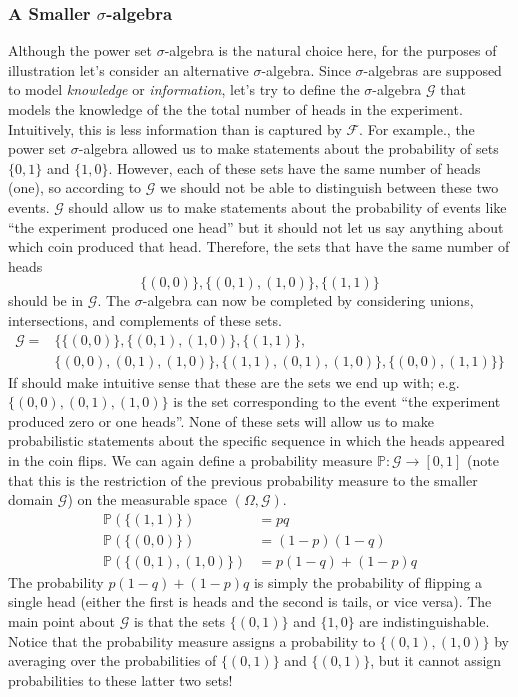 \documentclass[12pt]{article}
\newcommand{\Prob}{\mathbb{P}}
\begin{document}
\subsubsection{A Smaller $\sigma$-algebra}
Although the power set $\sigma$-algebra is the natural choice here, for the purposes of illustration let's consider an alternative 
$\sigma$-algebra. Since $\sigma$-algebras are supposed to model \textit{knowledge} or \textit{information}, let's try to define the $\sigma$-algebra $\mathcal{G}$ that models the knowledge of the the total number 
of heads in the experiment. Intuitively, this is less information than is captured by $\mathcal{F}$. For example., the power set $\sigma$-algebra allowed us to make statements about the probability of sets $\{0, 1\}$ and 
$\{1, 0\}$. However, each of these sets have the same number of heads (one), so according to $\mathcal{G}$ we should not be able to distinguish between these two events. $\mathcal{G}$ should allow us to make statements 
about the probability of events like ``the experiment produced one head'' but it should not let us say anything about which coin produced that head. Therefore, the sets that have the same number of heads
\[\{(0, 0)\}, \{(0, 1), (1, 0)\}, \{(1, 1)\}\] 
should be in $\mathcal{G}$. The $\sigma$-algebra can now be completed by considering unions, intersections, and complements of these sets.
\begin{align*}
\mathcal{G} = &\{\{(0, 0)\}, \{(0, 1), (1, 0)\}, \{(1, 1)\}, \\
		       &\{(0, 0), (0, 1), (1, 0)\}, \{(1, 1), (0, 1), (1, 0)\}, \{(0, 0), (1, 1)\} \}
\end{align*}
If should make intuitive sense that these are the sets we end up with; e.g. $\{(0, 0), (0, 1), (1, 0)\}$ is the set corresponding to the event ``the experiment produced zero or one heads''. None of these sets will allow us to make 
probabilistic statements about the specific sequence in which the heads appeared in the coin flips. We can again define a probability measure $\Prob: \mathcal{G} \to [0, 1]$ (note that this is the restriction of the previous 
probability measure to the smaller domain $\mathcal{G}$) on the measurable space $(\Omega, \mathcal{G})$. 
\begin{align*}
\Prob(\{(1, 1)\}) &= pq \\
\Prob(\{(0, 0)\}) &= (1 - p)(1 - q) \\
\Prob(\{(0, 1), (1, 0)\}) &= p(1 - q) + (1 - p)q
\end{align*}
The probability $p(1 - q) + (1 - p)q$ is simply the probability of flipping a single head (either the first is heads and the second is tails, or vice versa). 
The main point about $\mathcal{G}$ is that the sets $\{(0, 1)\}$ and $\{1, 0\}$ are indistinguishable. Notice that the probability measure assigns a probability to $\{(0, 1), (1, 0)\}$ by averaging over the probabilities 
of $\{(0, 1)\}$ and $\{(0, 1)\}$, but it cannot assign probabilities to these latter two sets! 
\end{document}
